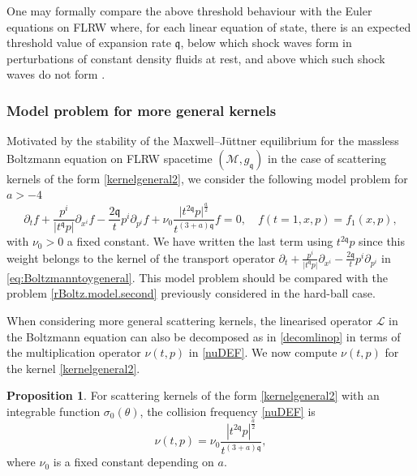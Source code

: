 \documentclass[reqno]{amsart}
\newcommand{\pv}{p}
\newcommand{\qq}{\mathfrak{q}}
\newcommand{\tqq}{t^{2\qq}}
\theoremstyle{definition}
\newtheorem{proposition}[theorem]{Proposition}
\numberwithin{equation}{section}
\numberwithin{theorem}{section}
\begin{document}
One may formally compare the above threshold behaviour with the Euler equations on FLRW where, for each linear equation of state, there is an expected threshold value of expansion rate \(\qq\), below which shock waves form in perturbations of constant density fluids at rest, and above which such shock waves do not form \cite{FMOOW}.




\subsubsection{Model problem for more general kernels}

Motivated by the stability of the Maxwell--J\"uttner equilibrium for the massless Boltzmann equation on FLRW spacetime \((\mathcal{M},g_{\qq})\) in the case of scattering kernels of the form \eqref{kernelgeneral2}, we consider the following model problem for $a>-4$
\begin{equation} \label{eq:Boltzmanntoygeneral}
	\partial_t f
	+
	\frac{p^i}{\vert t^\qq p \vert} \partial_{x^i} f
	-
	\frac{2\qq}{t} p^i \partial_{p^i} f
	+
	 \nu_0\frac{ \vert \tqq p \vert^{\frac{a}{2}}}{t^{(3+a)\qq}} f
	=
	0,\quad f(t=1,x,p)=f_1(x,p),
\end{equation}
with \(\nu_0>0\) a fixed constant. We have written the last term using \(t^{2\qq}p\) since this weight belongs to the kernel of the transport operator \(\partial_t 
	+
	\frac{p^i}{\vert t^\qq p \vert} \partial_{x^i} 
	-
	\frac{2\qq}{t} p^i \partial_{p^i}\) in \eqref{eq:Boltzmanntoygeneral}. This model problem should be compared with the problem \eqref{rBoltz.model.second} previously considered in the hard-ball case. 


When considering more general scattering kernels, the linearised operator \(\mathcal{L}\) in the Boltzmann equation can also be decomposed as in \eqref{decomlinop} in terms of the multiplication operator \(\nu(t,p)\) in \eqref{nuDEF}. We now compute \(\nu(t,p)\) for the kernel \eqref{kernelgeneral2}. 



\begin{proposition}
    For scattering kernels of the form \eqref{kernelgeneral2} with an integrable function $\sigma_0(\theta)$, the collision frequency \eqref{nuDEF} is 
    \[
    \nu(t,p)= \nu_0\frac{ |t^{2\qq }\pv|^{\frac{a}{2}} }{t^{(3+a)\qq}},
    \] where \(\nu_0\) is a fixed constant depending on \(a\).
\end{proposition}
\end{document}
